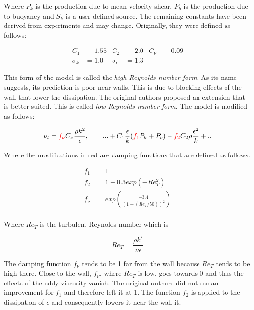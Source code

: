 \noindent Where $P_k$ is the production due to mean velocity shear, $P_b$ is
the production due to buoyancy and $S_k$ is a user defined source. The
remaining constants have been derived from experiments and may change.
Originally, they were defined as follows:

\begin{align*}
    C_1 &= 1.55         & C_2               &= 2.0  & C_{\nu} &= 0.09\\
    \sigma_k &= 1.0     & \sigma_{\epsilon} &= 1.3
\end{align*}

\noindent This form of the model is called the \textit{high-Reynolds-number
form}. As its name suggests, its prediction is poor near walls. This is due to
blocking effects of the wall that lower the dissipation. The original authors
proposed an extension that is better suited. This is called
\textit{low-Reynolds-number form}. The model is modified as follows:

\begin{align}
    \nu_t = \textcolor{red}{f_{\nu}} C_{\nu} \frac{\rho k^2}{\epsilon},  \qquad
%
    ... + C_1 \frac{\epsilon}{k}(\textcolor{red}{f_1} P_k + P_b) 
    - \textcolor{red}{f_2} C_2 \rho \frac{\epsilon^2}{k} + ..
\end{align}

\noindent Where the modifications in red are damping functions that are defined
as follows:

\begin{align}
    f_1 &= 1 \\
    f_2 &= 1 - 0.3 exp(-Re_T^2) \\
    f_{\nu} &= exp \left( \frac{-3.4}{(1 + (Re_T/50))^2}\right) \\
\end{align}

\noindent Where $Re_T$ is the turbulent Reynolds number which is:

\begin{equation}
    Re_T = \frac{\rho k^2}{\nu \epsilon} 
\end{equation}

\noindent The damping function $f_{\nu}$ tends to be 1 far from the wall
because $Re_T$ tends to be high there. Close to the wall, $f_{\nu}$, where
$Re_T$ is low, goes towards 0 and thus the effects of the eddy viscosity
vanish. The original authors did not see an improvement for $f_1$ and therefore
left it at 1. The function $f_2$ is applied to the dissipation of $\epsilon$
and consequently lowers it near the wall it.


